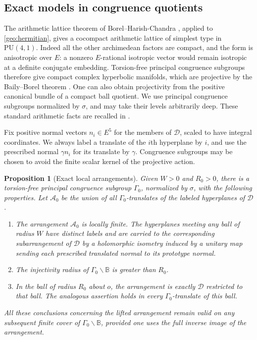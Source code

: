 \documentclass[11pt,reqno]{amsart}
\numberwithin{equation}{section}
\newtheorem{proposition}[theorem]{Proposition}
\theoremstyle{definition}
\theoremstyle{remark}
\newcommand{\BB}{\mathbb B}
\newcommand{\cD}{\mathcal D}
\begin{document}
\subsection{Exact models in congruence quotients}\label{geo:separation}

The arithmetic lattice theorem of Borel--Harish-Chandra
\cite[Corollary~12.4]{BorelHarishChandra1962}, applied to
\eqref{geo:hermitian}, gives a
cocompact arithmetic lattice of simplest type in $\mathrm{PU}(4,1)$.
Indeed all the other archimedean factors are compact, and the form is
anisotropic over $E$: a nonzero $E$-rational isotropic vector would
remain isotropic at a definite conjugate embedding.  Torsion-free
principal congruence subgroups therefore give compact complex
hyperbolic manifolds, which are projective by the Baily--Borel theorem
\cite[Theorem~10.11]{BailyBorel1966}.  One can
also obtain projectivity from the positive canonical bundle of a
compact ball quotient.  We use principal congruence subgroups normalized
by $\sigma$, and may take their levels arbitrarily deep.  These standard
arithmetic facts are recalled in \cite[Section~3.1]{StoverToledo}.

Fix positive normal vectors $n_i\in E^5$ for the members of $\cD$,
scaled to have integral coordinates.  We always label a translate of
the $i$th hyperplane by $i$, and use the prescribed normal $\gamma n_i$
for its translate by $\gamma$.  Congruence subgroups may be chosen to
avoid the finite scalar kernel of the projective action.

\begin{proposition}[Exact local arrangements]\label{prop:arrangement-local}
Given $W>0$ and $R_0>0$, there is a torsion-free principal congruence
subgroup $\Gamma_0$, normalized by $\sigma$, with the following
properties.  Let $\mathcal A_0$ be the union of all $\Gamma_0$-translates
of the labeled hyperplanes of $\cD$.
\begin{enumerate}
\item The arrangement $\mathcal A_0$ is locally finite.  The hyperplanes
meeting any ball of radius $W$ have distinct labels and are carried to
the corresponding subarrangement of $\cD$ by a holomorphic isometry
induced by a unitary map sending each prescribed translated normal to
its prototype normal.
\item The injectivity radius of $\Gamma_0\backslash\BB$ is greater than
$R_0$.
\item In the ball of radius $R_0$ about $o$, the arrangement is exactly
$\cD$ restricted to that ball.  The analogous assertion holds in every
$\Gamma_0$-translate of this ball.
\end{enumerate}
All these conclusions concerning the lifted arrangement remain valid
on any subsequent finite cover of $\Gamma_0\backslash\BB$, provided one
uses the full inverse image of the arrangement.
\end{proposition}
\end{document}
